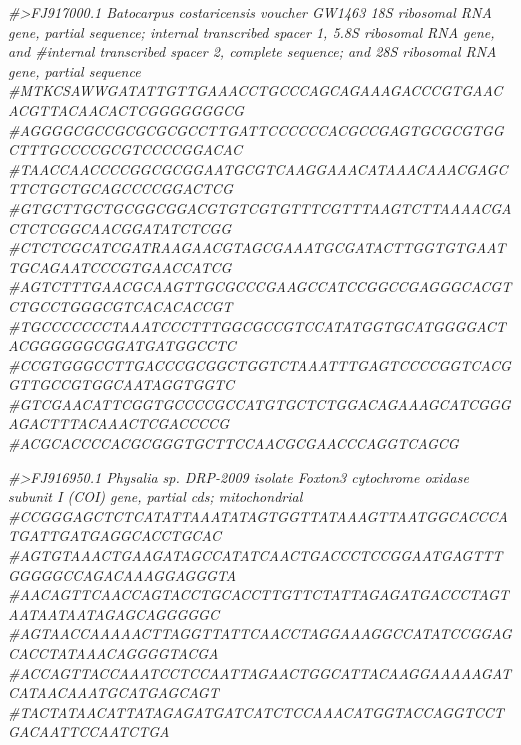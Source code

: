 \documentclass[]{article}
\newenvironment{Shaded}{\begin{snugshade}}{\end{snugshade}}
\newcommand{\CommentTok}[1]{\textcolor[rgb]{0.56,0.35,0.01}{\textit{#1}}}
\begin{document}
\begin{Shaded}
\begin{Highlighting}[]
\CommentTok{#>FJ917000.1 Batocarpus costaricensis voucher GW1463 18S ribosomal RNA gene, partial sequence; internal transcribed spacer 1, 5.8S ribosomal RNA gene, and #internal transcribed spacer 2, complete sequence; and 28S ribosomal RNA gene, partial sequence}
\CommentTok{#MTKCSAWWGATATTGTTGAAACCTGCCCAGCAGAAAGACCCGTGAACACGTTACAACACTCGGGGGGGCG}
\CommentTok{#AGGGGCGCCGCGCGCGCCTTGATTCCCCCCACGCCGAGTGCGCGTGGCTTTGCCCCGCGTCCCCGGACAC}
\CommentTok{#TAACCAACCCCGGCGCGGAATGCGTCAAGGAAACATAAACAAACGAGCTTCTGCTGCAGCCCCGGACTCG}
\CommentTok{#GTGCTTGCTGCGGCGGACGTGTCGTGTTTCGTTTAAGTCTTAAAACGACTCTCGGCAACGGATATCTCGG}
\CommentTok{#CTCTCGCATCGATRAAGAACGTAGCGAAATGCGATACTTGGTGTGAATTGCAGAATCCCGTGAACCATCG}
\CommentTok{#AGTCTTTGAACGCAAGTTGCGCCCGAAGCCATCCGGCCGAGGGCACGTCTGCCTGGGCGTCACACACCGT}
\CommentTok{#TGCCCCCCCTAAATCCCTTTGGCGCCGTCCATATGGTGCATGGGGACTACGGGGGGCGGATGATGGCCTC}
\CommentTok{#CCGTGGGCCTTGACCCGCGGCTGGTCTAAATTTGAGTCCCCGGTCACGGTTGCCGTGGCAATAGGTGGTC}
\CommentTok{#GTCGAACATTCGGTGCCCCGCCATGTGCTCTGGACAGAAAGCATCGGGAGACTTTACAAACTCGACCCCG}
\CommentTok{#ACGCACCCCACGCGGGTGCTTCCAACGCGAACCCAGGTCAGCG}

\CommentTok{#>FJ916950.1 Physalia sp. DRP-2009 isolate Foxton3 cytochrome oxidase subunit I (COI) gene, partial cds; mitochondrial}
\CommentTok{#CCGGGAGCTCTCATATTAAATATAGTGGTTATAAAGTTAATGGCACCCATGATTGATGAGGCACCTGCAC}
\CommentTok{#AGTGTAAACTGAAGATAGCCATATCAACTGACCCTCCGGAATGAGTTTGGGGGCCAGACAAAGGAGGGTA}
\CommentTok{#AACAGTTCAACCAGTACCTGCACCTTGTTCTATTAGAGATGACCCTAGTAATAATAATAGAGCAGGGGGC}
\CommentTok{#AGTAACCAAAAACTTAGGTTATTCAACCTAGGAAAGGCCATATCCGGAGCACCTATAAACAGGGGTACGA}
\CommentTok{#ACCAGTTACCAAATCCTCCAATTAGAACTGGCATTACAAGGAAAAAGATCATAACAAATGCATGAGCAGT}
\CommentTok{#TACTATAACATTATAGAGATGATCATCTCCAAACATGGTACCAGGTCCTGACAATTCCAATCTGA}
\end{Highlighting}
\end{Shaded}
\end{document}
